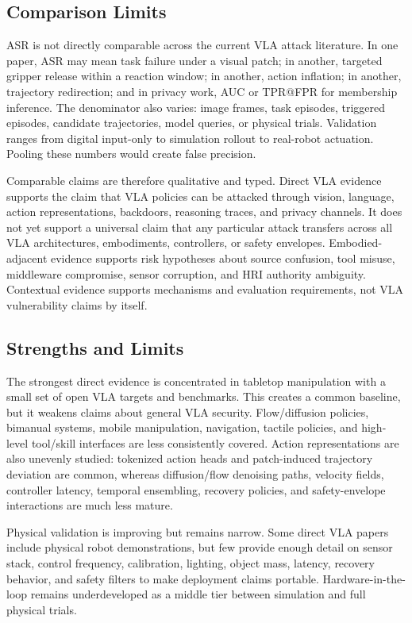 \subsection{Comparison Limits}

ASR is not directly comparable across the current VLA attack literature. In one paper, ASR may mean task failure under a visual patch; in another, targeted gripper release within a reaction window; in another, action inflation; in another, trajectory redirection; and in privacy work, AUC or TPR@FPR for membership inference. The denominator also varies: image frames, task episodes, triggered episodes, candidate trajectories, model queries, or physical trials. Validation ranges from digital input-only to simulation rollout to real-robot actuation. Pooling these numbers would create false precision.

Comparable claims are therefore qualitative and typed. Direct VLA evidence supports the claim that VLA policies can be attacked through vision, language, action representations, backdoors, reasoning traces, and privacy channels. It does not yet support a universal claim that any particular attack transfers across all VLA architectures, embodiments, controllers, or safety envelopes. Embodied-adjacent evidence supports risk hypotheses about source confusion, tool misuse, middleware compromise, sensor corruption, and HRI authority ambiguity. Contextual evidence supports mechanisms and evaluation requirements, not VLA vulnerability claims by itself.

\subsection{Strengths and Limits}

The strongest direct evidence is concentrated in tabletop manipulation with a small set of open VLA targets and benchmarks. This creates a common baseline, but it weakens claims about general VLA security. Flow/diffusion policies, bimanual systems, mobile manipulation, navigation, tactile policies, and high-level tool/skill interfaces are less consistently covered. Action representations are also unevenly studied: tokenized action heads and patch-induced trajectory deviation are common, whereas diffusion/flow denoising paths, velocity fields, controller latency, temporal ensembling, recovery policies, and safety-envelope interactions are much less mature.

Physical validation is improving but remains narrow. Some direct VLA papers include physical robot demonstrations, but few provide enough detail on sensor stack, control frequency, calibration, lighting, object mass, latency, recovery behavior, and safety filters to make deployment claims portable. Hardware-in-the-loop remains underdeveloped as a middle tier between simulation and full physical trials.


